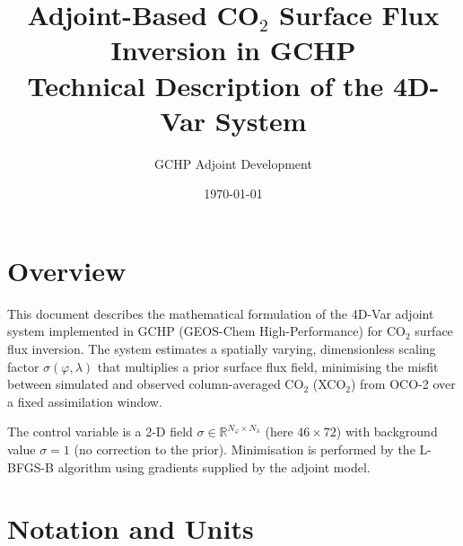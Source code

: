 \documentclass[12pt]{article}
\title{\textbf{Adjoint-Based CO$_2$ Surface Flux Inversion in GCHP}\\
\large Technical Description of the 4D-Var System}
\author{GCHP Adjoint Development}
\date{\today}
\begin{document}
\maketitle
\tableofcontents
\newpage

\section{Overview}

This document describes the mathematical formulation of the 4D-Var adjoint system
implemented in GCHP (GEOS-Chem High-Performance) for CO$_2$ surface flux
inversion. The system estimates a spatially varying, dimensionless scaling factor
$\sigma(\varphi, \lambda)$ that multiplies a prior surface flux field, minimising
the misfit between simulated and observed column-averaged CO$_2$ (XCO$_2$) from
OCO-2 over a fixed assimilation window.

The control variable is a 2-D field $\sigma \in \mathbb{R}^{N_\varphi \times N_\lambda}$
(here $46 \times 72$) with background value $\sigma = 1$ (no correction to the prior).
Minimisation is performed by the L-BFGS-B algorithm using gradients supplied by
the adjoint model.

\section{Notation and Units}
\end{document}
